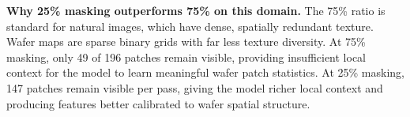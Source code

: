 \documentclass[11pt]{article}
\begin{document}
\textbf{Why 25\% masking outperforms 75\% on this domain.} The 75\% ratio is standard for natural images, which have dense, spatially redundant texture. Wafer maps are sparse binary grids with far less texture diversity. At 75\% masking, only 49 of 196 patches remain visible, providing insufficient local context for the model to learn meaningful wafer patch statistics. At 25\% masking, 147 patches remain visible per pass, giving the model richer local context and producing features better calibrated to wafer spatial structure.
\end{document}
